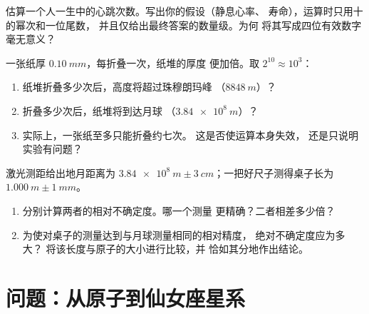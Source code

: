 \begin{exercise}[$\star\star\star$]\label{exo:g10:orders-of-magnitude:13}
估算一个人一生中的心跳次数。写出你的假设（静息心率、
寿命），运算时只用十的幂次和一位尾数，
并且仅给出最终答案的数量级。为何
将其写成四位有效数字
毫无意义？
\end{exercise}

\begin{exercise}[$\star\star\star$]\label{exo:g10:orders-of-magnitude:14}
一张纸厚 $\qty{0.10}{mm}$，每折叠一次，纸堆的厚度
便加倍。取 $2^{10} \approx 10^{3}$：
\begin{enumerate}
  \item 纸堆折叠多少次后，高度将超过珠穆朗玛峰
        （$\qty{8848}{m}$）？
  \item 折叠多少次后，纸堆将到达月球
        （$\qty{3.84e8}{m}$）？
  \item 实际上，一张纸至多只能折叠约七次。
        这是否使运算本身失效，
        还是只说明实验有问题？
\end{enumerate}
\end{exercise}

\begin{exercise}[$\star\star\star$]\label{exo:g10:orders-of-magnitude:15}
激光测距给出地月距离为
$\qty{3.84e8}{m} \pm \qty{3}{cm}$；一把好尺子测得桌子长为
$\qty{1.000}{m} \pm \qty{1}{mm}$。
\begin{enumerate}
  \item 分别计算两者的相对不确定度。哪一个测量
        更精确？二者相差多少倍？
  \item 为使对桌子的测量达到与月球测量相同的相对精度，
        绝对不确定度应为多大？
        将该长度与原子的大小进行比较，并
        恰如其分地作出结论。
\end{enumerate}
\end{exercise}

\section{问题：从原子到仙女座星系}

